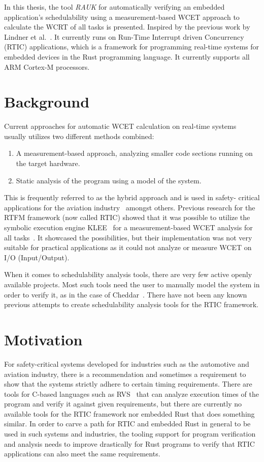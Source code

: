 In this thesis, the tool \emph{RAUK} for automatically verifying an embedded
application's schedulability using a measurement-based WCET approach to
calculate the WCRT of all tasks is presented. Inspired by the previous work by
Lindner et al.\ \cite{lindner}. It currently runs on Run-Time Interrupt driven
Concurrency (RTIC) applications, which is a framework for programming real-time
systems for embedded devices in the Rust programming language. It currently
supports all ARM Cortex-M processors.

\section{Background}
Current approaches for automatic WCET calculation on real-time systems usually
utilizes two different methods combined:
\begin{enumerate}
    \item A measurement-based approach, analyzing smaller code sections running
        on the target hardware.
    \item Static analysis of the program using a model of the system.
\end{enumerate}
This is frequently referred to as the hybrid approach and is used in safety-
critical applications for the aviation industry~\cite{rapita} amongst others.
Previous research for the RTFM framework (now called RTIC) showed that it was
possible to utilize the symbolic execution engine KLEE~\cite{kleepaper} for a
measurement-based WCET analysis for all tasks~\cite{lindner}. It showcased the
possibilities, but their implementation was not very suitable for practical
applications as it could not analyze or measure WCET on I/O (Input/Output).

When it comes to schedulability analysis tools, there are very few active openly
available projects. Most such tools need the user to manually model the system
in order to verify it, as in the case of Cheddar~\cite{cheddar}. There have not
been any known previous attempts to create schedulability analysis tools for
the RTIC framework.

\section{Motivation}
For safety-critical systems developed for industries such as the automotive and
aviation industry, there is a recommendation and sometimes a requirement to
show that the systems strictly adhere to certain timing requirements. There
are tools for C-based languages such as RVS~\cite{rapita} that can analyze
execution times of the program and verify it against given requirements, but
there are currently no available tools for the RTIC framework nor embedded Rust
that does something similar. In order to carve a path for RTIC and embedded
Rust in general to be used in such systems and industries, the tooling support
for program verification and analysis needs to improve drastically for Rust
programs to verify that RTIC applications can also meet the same requirements.


